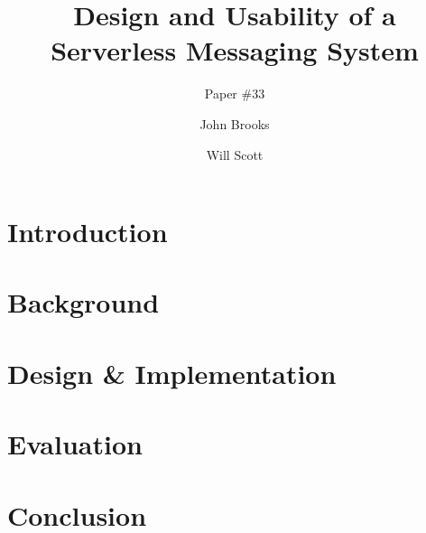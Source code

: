 \documentclass{sig-alternate-10pt}
\title{Design and Usability of a Serverless Messaging System}
\author{Paper \#33}
\author{John Brooks}
\author{Will Scott}
\begin{document}
\maketitle

\begin{abstract}
%
\end{abstract}




\section{Introduction}
%

\section{Background}
%

\section{Design \& Implementation}


\section{Evaluation}


\section{Conclusion}
%


\pagebreak

  



\end{document}
